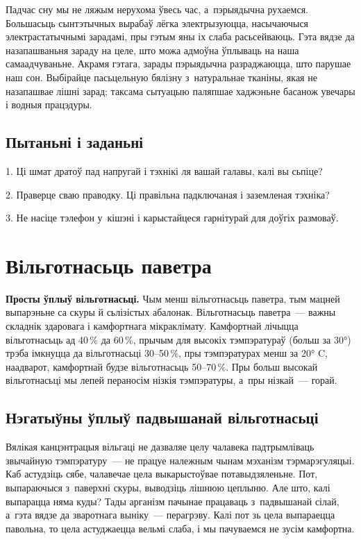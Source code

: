 Падчас сну мы не ляжым нерухома ўвесь час, а~пэрыядычна рухаемся. Большасьць сынтэтычных вырабаў лёгка электрызуюцца, насычаючыся электрастатычнымі зарадамі, пры гэтым яны іх слаба расьсейваюць. Гэта вядзе да назапашваньня зараду на целе, што можа адмоўна ўплываць на наша самаадчуваньне. Акрамя гэтага, зарады пэрыядычна разраджаюцца, што парушае наш сон. Выбірайце пасьцельную бялізну з~натуральнае тканіны, якая не назапашвае лішні зарад; таксама сытуацыю паляпшае хаджэньне басанож увечары і водныя працэдуры.

\subsection*{Пытаньні і заданьні}

1. Ці шмат дратоў пад напругай і тэхнікі ля вашай галавы, калі вы сьпіце?

2. Праверце сваю праводку. Ці правільна падключаная і заземленая тэхніка?

3. Не насіце тэлефон у~кішэні і карыстайцеся гарнітурай для доўгіх размоваў.


\section{Вільготнасьць паветра}

\textbf{Просты ўплыў вільготнасьці.} Чым менш вільготнасьць паветра, тым мацней выпарэньне са скуры й сьлізістых абалонак.
Вільготнасьць паветра~--- важны складнік здаровага і камфортнага мікраклімату. Камфортнай лічыцца вільготнасьць ад 40\,\% да 60\,\%, прычым для высокіх тэмпэратураў (больш за 30°) трэба імкнуцца да вільготнасьці 30--50\,\%, пры тэмпэратурах менш за 20° C, наадварот, камфортнай будзе вільготнасьць 50--70\,\%. Пры больш высокай вільготнасьці мы лепей пераносім нізкія тэмпэратуры, а~пры нізкай~--- горай.

\subsection*{Нэгатыўны ўплыў падвышанай вільготнасьці}

Вялікая канцэнтрацыя вільгаці не дазваляе целу чалавека падтрымліваць звычайную тэмпэратуру~--- не працуе належным чынам мэханізм тэрмарэгуляцыі. Каб астудзіць сябе, чалавечае цела выкарыстоўвае потавыдзяленьне. Пот, выпараючыся з~паверхні скуры, выводзіць лішнюю цеплыню. Але што, калі выпарацца няма куды? Тады арганізм пачынае працаваць з~падвышанай сілай, а~гэта вядзе да зваротнага выніку~--- перагрэву. Калі пот зь цела выпараецца павольна, то цела астуджаецца вельмі слаба, і мы пачуваемся не зусім камфортна.

